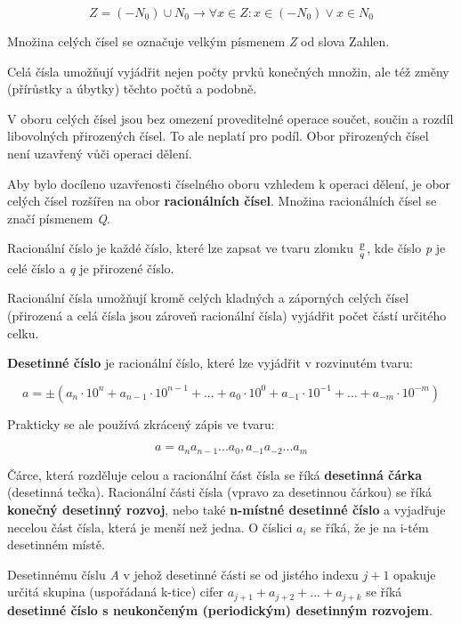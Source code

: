 $$ Z = (-N_0) \cup N_0 \rightarrow \forall x \in Z: x \in (-N_0) \vee x \in N_0 $$

Množina celých čísel se označuje velkým písmenem {\it Z} od slova Zahlen.

Celá čísla umožňují vyjádřit nejen počty prvků konečných množin, ale též změny (přírůstky a úbytky) těchto počtů a podobně.


V oboru celých čísel jsou bez omezení proveditelné operace součet, součin a rozdíl libovolných přirozených čísel. To ale neplatí pro podíl. Obor přirozených čísel není uzavřený vůči operaci dělení.


Aby bylo docíleno uzavřenosti číselného oboru vzhledem k operaci dělení, je obor celých čísel rozšířen na obor {\bf racionálních čísel}. Množina racionálních čísel se značí písmenem {\it Q}.

Racionální číslo je každé číslo, které lze zapsat ve tvaru zlomku $p\over q$, kde číslo {\it p} je celé číslo a {\it q} je přirozené číslo.

Racionální čísla umožňují kromě celých kladných a záporných celých čísel (přirozená a celá čísla jsou zároveň racionální čísla) vyjádřit počet částí určitého celku.


{\bf Desetinné číslo} je racionální číslo, které lze vyjádřit v rozvinutém tvaru:

$$ a = \pm(a_n \cdot 10^n +a_{n-1}\cdot 10^{n-1} +...+ {a_0 \cdot 10^0}+ {a_{-1} \cdot 10^{-1}} + ... +{a_{-m} \cdot 10^{-m}}) $$

Prakticky se ale používá zkrácený zápis ve tvaru:

$$ a = a_n a_{n-1} ... a_0, a_{-1} a_{-2} ... a_m $$

Čárce, která rozděluje celou a racionální část čísla se říká {\bf desetinná čárka} (desetinná tečka). Racionální části čísla (vpravo za desetinnou čárkou) se říká {\bf konečný desetinný rozvoj}, nebo také {\bf n-místné desetinné číslo} a vyjadřuje necelou část čísla, která je menší než jedna. O číslici $a_i$ se říká, že je na i-tém desetinném místě.

Desetinnému číslu {\it A} v jehož desetinné části se od jistého indexu $j+1$ opakuje určitá skupina (uspořádaná k-tice) cifer $a_{j+1}+a_{j+2}+...+a_{j+k}$ se říká {\bf desetinné číslo s neukončeným (periodickým) desetinným rozvojem}.

